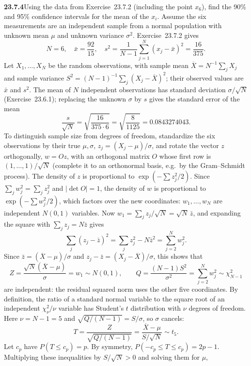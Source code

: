 \par\bigskip
\noindent\textbf{23.7.4}\quad Using the data from Exercise~23.7.2
(including the point $x_{6}$), find the 90\% and 95\% confidence
intervals for the mean of the $x_{i}$.
\solution
Assume the six measurements are an independent sample from a normal
population with unknown mean $\mu$ and unknown variance $\sigma^2$.
Exercise~23.7.2 gives
\[
N=6,\quad\bar x=\frac{92}{15},\quad
s^2=\frac1{N-1}\sum_{j=1}^N(x_j-\bar x)^2=\frac{16}{375}.
\]
Let $X_1,\ldots,X_N$ be the random observations, with sample mean
$\overline X=N^{-1}\sum_jX_j$ and sample variance
$S^2=(N-1)^{-1}\sum_j(X_j-\overline X)^2$; their observed values are
$\bar x$ and $s^2$. The mean of $N$ independent observations has
standard deviation $\sigma/\sqrt N$ (Exercise~23.6.1); replacing the
unknown $\sigma$ by $s$ gives the standard error of the mean
\[
\frac{s}{\sqrt N}=\sqrt{\frac{16}{375\cdot6}}
=\sqrt{\frac8{1125}}=0.0843274043.
\]
To distinguish sample size from degrees of freedom, standardize the
six observations by their true $\mu,\sigma$, $z_j=(X_j-\mu)/\sigma$,
and rotate the vector $z$ orthogonally, $w=Oz$, with an orthogonal
matrix $O$ whose first row is $(1,\ldots,1)/\sqrt N$ (complete it to an
orthonormal basis, e.g.\ by the Gram--Schmidt process). The density of
$z$ is proportional to $\exp(-\sum z_j^2/2)$. Since
$\sum_jw_j^2=\sum_jz_j^2$ and $|\det O|=1$, the density of $w$ is
proportional to $\exp(-\sum w_j^2/2)$, which factors over the new
coordinates: $w_1,\ldots,w_N$ are independent $N(0,1)$ variables. Now
$w_1=\sum_jz_j/\sqrt N=\sqrt N\,\bar z$, and expanding the square with
$\sum_jz_j=N\bar z$ gives
\[
\sum_j(z_j-\bar z)^2=\sum_jz_j^2-N\bar z^2=\sum_{j=2}^Nw_j^2.
\]
Since $\bar z=(\overline X-\mu)/\sigma$ and
$z_j-\bar z=(X_j-\overline X)/\sigma$, this shows that
\[
Z=\frac{\sqrt N(\overline X-\mu)}\sigma=w_1\sim N(0,1),\qquad
Q=\frac{(N-1)S^2}{\sigma^2}=\sum_{j=2}^Nw_j^2\sim\chi^2_{N-1}
\]
are independent: the residual squared norm uses the other five
coordinates. By definition, the ratio of a standard normal variable to
the square root of an independent $\chi^2_\nu/\nu$ variable has
Student's $t$ distribution with $\nu$ degrees of freedom. Here
$\nu=N-1=5$ and $\sqrt{Q/(N-1)}=S/\sigma$, so $\sigma$ cancels:
\[
T=\frac{Z}{\sqrt{Q/(N-1)}}
=\frac{\overline X-\mu}{S/\sqrt N}\sim t_5.
\]
Let $c_p$ have $P(T\le c_p)=p$. By symmetry,
$P(-c_p\le T\le c_p)=2p-1$. Multiplying these inequalities by
$S/\sqrt N>0$ and solving them for $\mu$,
